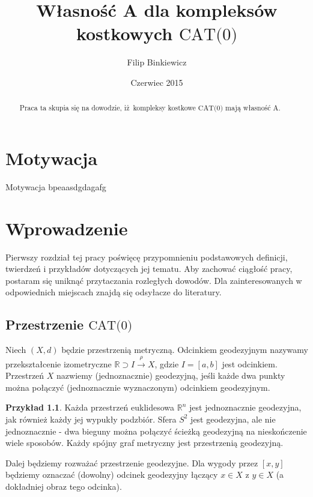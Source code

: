 \documentclass[licencjacka]{pracamgr}
\author{Filip Binkiewicz}
\title{Własność A dla kompleksów kostkowych $\text{CAT(0)}$}
\date{Czerwiec 2015}
\theoremstyle{definition}
\theoremstyle{definition}
\theoremstyle{definition}
\newtheorem{example}{Przykład}[section]
\theoremstyle{definition}
\theoremstyle{plain}
\theoremstyle{plain}
\begin{document}
\maketitle


\begin{abstract}
	Praca ta skupia się na dowodzie, iż kompleksy kostkowe $\text{CAT(0)} $
	mają własność A.
\end{abstract}

\tableofcontents

\chapter*{Motywacja}

Motywacja bpeaasdgdagafg

\chapter{Wprowadzenie}

Pierwszy rozdział tej pracy poświęcę przypomnieniu podstawowych definicji, 
twierdzeń i przykładów dotyczących jej tematu. Aby zachować ciągłość pracy, 
postaram się uniknąć przytaczania rozległych dowodów. Dla zainteresowanych 
w odpowiednich miejscach znajdą się odsyłacze do literatury.

\section{Przestrzenie $\text{CAT(0)}$}
Niech $ (X, d) $ będzie przestrzenią metryczną. Odcinkiem geodezyjnym nazywamy 
przekształcenie izometryczne $ \mathbb{R} \supset I \xrightarrow{\rho} X $, gdzie 
$ I =[a,b]$ jest odcinkiem. Przestrzeń $ X $ nazwiemy (jednoznacznie) geodezyjną, 
jeśli każde dwa punkty można połączyć (jednoznacznie wyznaczonym) odcinkiem 
geodezyjnym.

\begin{example}
	Każda przestrzeń euklidesowa $ \mathbb{R}^n $ jest jednoznacznie geodezyjna, 
	jak również każdy jej wypukły podzbiór. Sfera $ S^2 $ jest geodezyjna, ale 
	nie jednoznacznie - dwa bieguny można połączyć ścieżką geodezyjną na 
	nieskończenie wiele sposobów. Każdy spójny graf metryczny jest przestrzenią 
	geodezyjną.
\end{example}

Dalej będziemy rozważać przestrzenie geodezyjne. Dla wygody przez $ [x,y] $ będziemy 
oznaczać (dowolny) odcinek geodezyjny łączący $ x \in X$ z $ y \in X $ (a dokładniej 
obraz tego odcinka).
\end{document}
